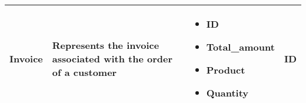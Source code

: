 \begin{longtable}{|p{}|p{} |p{}|p{} |}
    Invoice & Represents the invoice associated with the order of a customer &
        \begin{itemize}
            \vspace{-1em}
            \item ID
            \item Total\_amount     %
            \item Product           %
            \item Quantity
        \end{itemize}
        &  ID \\\hline
\end{longtable}